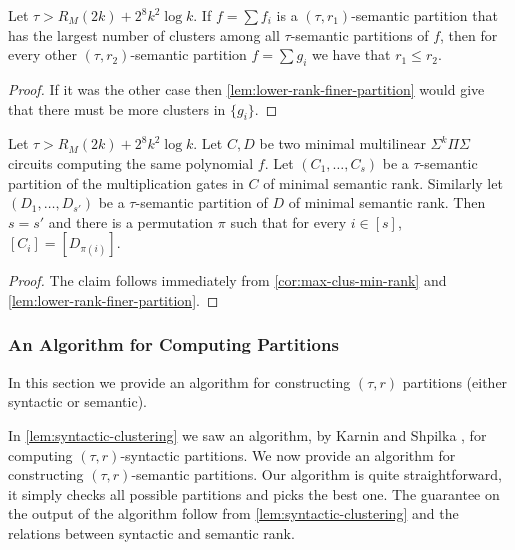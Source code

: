 \documentclass[12pt]{article}
\newcommand{\Sps}[1]{\Sigma^{#1} \Pi\Sigma}
\begin{document}
	
	\begin{corollary}\label{cor:max-clus-min-rank}
		Let  $\tau > R_M(2k) + 2^8 k^2 \log k$.
		If $f=\sum f_i$ is a  $(\tau,r_1)$-semantic partition that has the largest number of clusters among all $\tau$-semantic partitions of $f$, then for every other $(\tau,r_2)$-semantic partition $f=\sum g_i$ we have that $r_1\leq r_{2}$.
	\end{corollary}
	
	\begin{proof}
		If it was the other case then \autoref{lem:lower-rank-finer-partition} would give that there must be more clusters in $\{g_i\}$. 
	\end{proof}
	
	
	
	
	\begin{corollary}\label{cor:unique-semantic}
		Let $\tau > R_M(2k) + 2^8 k^2 \log k$.
		Let $C, D$ be two minimal multilinear $\Sps{k}$ circuits computing the same polynomial $f$. Let $(C_1, \ldots, C_s)$ be a $\tau$-semantic partition of the multiplication gates in $C$ of minimal semantic rank. Similarly let $(D_1, \ldots, D_{s'})$ be a $\tau$-semantic partition of  $D$ of minimal semantic rank.
		Then $s=s'$ and there is a permutation $\pi$ such that for every $i\in[s]$, $[C_i]=[D_{\pi(i)}]$.	
	\end{corollary}
	
	\begin{proof}
		The claim follows immediately from \autoref{cor:max-clus-min-rank} and  \autoref{lem:lower-rank-finer-partition}.
	\end{proof}
	
	
	
	
	
	
	\subsubsection{An Algorithm for Computing Partitions}
	
	In this section we provide an algorithm for constructing $(\tau,r)$ partitions (either syntactic or semantic).
	
	In \autoref{lem:syntactic-clustering} we saw an algorithm,  by Karnin and Shpilka \cite{KarninShpilka09}, for computing $(\tau,r)$-syntactic partitions.
	We now provide an algorithm for constructing $(\tau,r)$-semantic partitions. Our algorithm is quite straightforward, it  simply checks all possible partitions and picks the best one. The guarantee on the output of the algorithm follow from \autoref{lem:syntactic-clustering} and the relations between syntactic and semantic rank.
	
\end{document}
